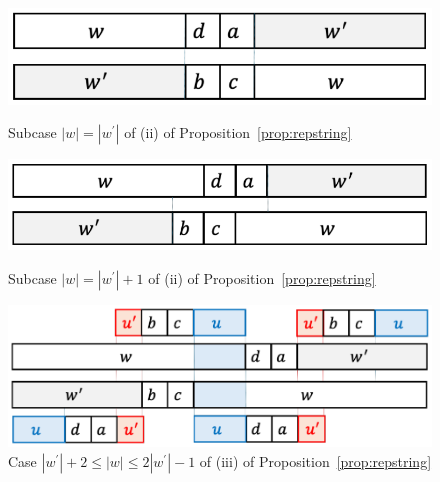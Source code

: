 \begin{figure}[t]
\begin{center}
  \includegraphics[scale=0.345]{figs/w=w_1.pdf}
  \caption{Subcase $|w| = |w^{\prime}|$ of (ii) of Proposition~\ref{prop:repstring}}\label{fig:prop_pic7}
  \bigskip
  \includegraphics[scale=0.345]{figs/w=w_1+1.pdf}
  \caption{Subcase $|w| = |w^{\prime}| + 1$ of (ii) of Proposition~\ref{prop:repstring}}\label{fig:prop_pic8}
\end{center}
\end{figure}

\begin{figure}[t]
\begin{center}
  \includegraphics[scale=0.345]{figs/w=w_1+2.pdf}
  \caption{Case $|w^{\prime}| + 2 \le |w| \le 2|w^{\prime}| - 1$ of (iii) of Proposition~\ref{prop:repstring}}\label{fig:prop_pic9}
\end{center}
\end{figure}

